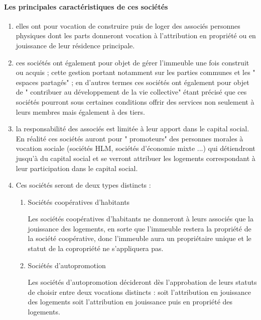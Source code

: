 		\paragraph{Les principales caractéristiques de ces sociétés}
		
	\begin{enumerate}[label=\arabic*)]
		\item elles ont pour vocation de construire puis de loger des associés personnes physiques dont les parts
		donneront vocation à l'attribution en propriété ou en jouissance de leur résidence principale.
		
		\item ces sociétés ont également pour objet de gérer l'immeuble une fois construit ou acquis ; cette gestion
		portant notamment sur les parties communes et les " espaces partagés" ; en d'autres termes ces sociétés
		ont également pour objet de " contribuer au développement de la vie collective" étant précisé que ces
		sociétés pourront sous certaines conditions offrir des services non seulement à leurs membres mais
		également à des tiers.
		
		\item  la responsabilité des associés est limitée à leur apport dans le capital social.
		En réalité ces sociétés auront pour " promoteurs" des personnes morales à vocation sociale (sociétés HLM,
		sociétés d'économie mixte ...) qui détiendront jusqu'à  du capital social et se verront attribuer les
		logements correspondant à leur participation dans le capital social.
		
		\item Ces sociétés seront de deux types distincts :
		\begin{enumerate}[label=\roman*)]
			\item Sociétés coopératives d'habitants
			
			Les sociétés coopératives d'habitants ne donneront à leurs associés que la jouissance des logements, en
			sorte que l'immeuble restera la propriété de la société coopérative, donc l'immeuble aura un propriétaire
			unique et le statut de la copropriété ne s'appliquera pas.
			
			\item Sociétés d'autopromotion
			
			Les sociétés d'autopromotion décideront dès l'approbation de leurs statuts de choisir entre deux vocations
			distincts : soit l'attribution en jouissance des logements soit l'attribution en jouissance puis en propriété
			des logements.
			

\end{enumerate}
\end{enumerate}
